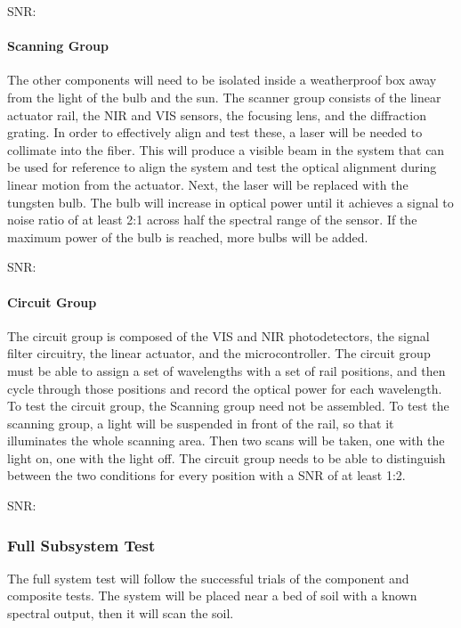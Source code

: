 SNR:

\paragraph{Scanning Group} The other components will need to be isolated inside a weatherproof box away from the light of the bulb and the sun. The scanner group consists of the linear actuator rail, the NIR and VIS sensors, the focusing lens, and the diffraction grating. In order to effectively align and test these, a laser will be needed to collimate into the fiber. This will produce a visible beam in the system that can be used for reference to align the system and test the optical alignment during linear motion from the actuator. Next, the laser will be replaced with the tungsten bulb. The bulb will increase in optical power until it achieves a signal to noise ratio of at least 2:1 across half the spectral range of the sensor. If the maximum power of the bulb is reached, more bulbs will be added.
\bigskip

SNR:

\paragraph{Circuit Group} The circuit group is composed of the VIS and NIR photodetectors, the signal filter circuitry, the linear actuator, and the microcontroller. The circuit group must be able to assign a set of wavelengths with a set of rail positions, and then cycle through those positions and record the optical power for each wavelength. To test the circuit group, the Scanning group need not be assembled. To test the scanning group, a light will be suspended in front of the rail, so that it illuminates the whole scanning area. Then two scans will be taken, one with the light on, one with the light off. The circuit group needs to be able to distinguish between the two conditions for every position with a SNR of at least 1:2.
\bigskip

SNR:

\subsubsection{Full Subsystem Test}

The full system test will follow the successful trials of the component and composite tests. The system will be placed near a bed of soil with a known spectral output, then it will scan the soil.
